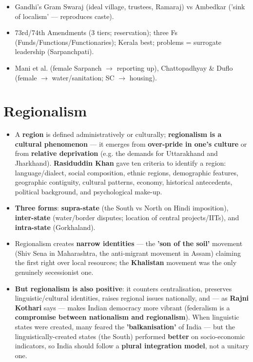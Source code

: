 \begin{QuickRevision}
\begin{itemize}
\item Gandhi's Gram Swaraj (ideal village, trustees, Ramaraj) vs Ambedkar ('sink of localism' --- reproduces caste).
\item 73rd/74th Amendments (3 tiers; reservation); three Fs (Funds/Functions/Functionaries); Kerala best; problems = surrogate leadership (Sarpanchpati).
\item Mani et al. (female Sarpanch $\rightarrow$ reporting up), Chattopadhyay \& Duflo (female $\rightarrow$ water/sanitation; SC $\rightarrow$ housing).
\end{itemize}
\end{QuickRevision}

\section{Regionalism}

\begin{KeyConcept}
\begin{itemize}
\item A \textbf{region} is defined administratively or culturally; \textbf{regionalism is a cultural phenomenon} --- it emerges from \textbf{over-pride in one's culture} or from \textbf{relative deprivation} (e.g. the demands for Uttarakhand and Jharkhand). \textbf{Rasiduddin Khan} gave ten criteria to identify a region: language/dialect, social composition, ethnic regions, demographic features, geographic contiguity, cultural patterns, economy, historical antecedents, political background, and psychological make-up.
\item \textbf{Three forms}: \textbf{supra-state} (the South vs North on Hindi imposition), \textbf{inter-state} (water/border disputes; location of central projects/IITs), and \textbf{intra-state} (Gorkhaland).
\item Regionalism creates \textbf{narrow identities} --- the \textbf{'son of the soil'} movement (Shiv Sena in Maharashtra, the anti-migrant movement in Assam) claiming the first right over local resources; the \textbf{Khalistan} movement was the only genuinely secessionist one.
\item \textbf{But regionalism is also positive}: it counters centralisation, preserves linguistic/cultural identities, raises regional issues nationally, and --- as \textbf{Rajni Kothari} says --- makes Indian democracy more vibrant (federalism is a \textbf{compromise between nationalism and regionalism}). When linguistic states were created, many feared the \textbf{'balkanisation'} of India --- but the linguistically-created states (the South) performed \textbf{better} on socio-economic indicators, so India should follow a \textbf{plural integration model}, not a unitary one.
\end{itemize}
\end{KeyConcept}

